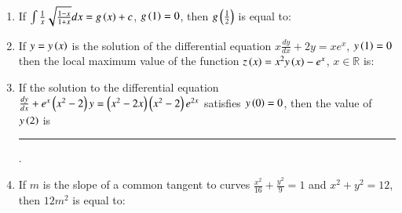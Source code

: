 \documentclass[journal,12pt,onecolumn]{IEEEtran}
\theoremstyle{remark}
\begin{document}
\begin{enumerate}
\item If $\int\frac{1}{x}\sqrt{\frac{1-x}{1+x}}dx=g\left(x\right)+c$, $g\left(1\right)=0$, then $g\left(\frac{1}{2}\right)$ is equal to:

\hfill{}
\begin{enumerate}
\end{enumerate}

\item If $y=y\left(x\right)$ is the solution of the differential equation $x\frac{dy}{dx}+2y=xe^x$, $y\left(1\right)=0$ then the local maximum value of the function $z\left(x\right)=x^2 y\left(x\right) - e^x$, $x \in \mathbb{R}$ is:

\hfill{}
\begin{enumerate}
\end{enumerate}

\item If the solution to the differential equation $\frac{dy}{dx}+e^{x}\left(x^2-2\right)y=\left(x^2-2x\right)\left(x^2-2\right)e^{2x}$ satisfies $y\left(0\right)=0$, then the value of $y\left(2\right)$ is \rule{1cm}{0.15mm}.

\hfill{}
\begin{enumerate}
\end{enumerate}

\item If $m$ is the slope of a common tangent to curves $\frac{x^2}{16}+\frac{y^2}{9}=1$ and $x^2+y^2=12$, then $12m^2$ is equal to:


\end{enumerate}
\end{document}
